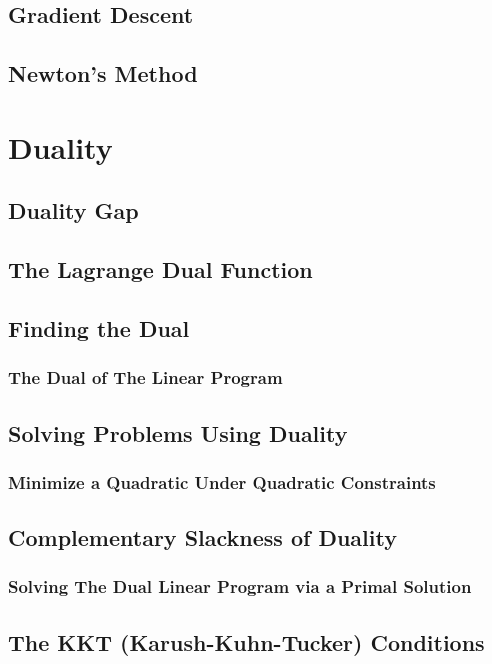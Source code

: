 \documentclass{article}
\begin{document}
\subsection{Gradient Descent}

\subsection{Newton's Method}

\section{Duality}

\subsection{Duality Gap}

\subsection{The Lagrange Dual Function}

\subsection{Finding the Dual}

\subsubsection{The Dual of The Linear Program}

\subsection{Solving Problems Using Duality}

\subsubsection{Minimize a Quadratic Under Quadratic Constraints}

\subsection{Complementary Slackness of Duality}

\subsubsection{Solving The Dual Linear Program via a Primal Solution}

\subsection{The KKT (Karush-Kuhn-Tucker) Conditions}
\end{document}
